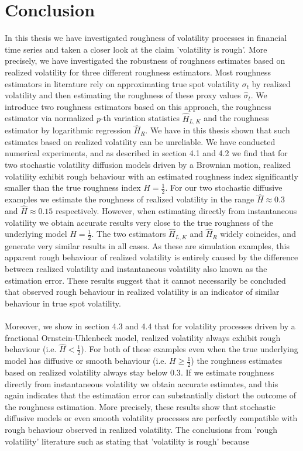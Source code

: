 \documentclass{article}
\begin{document}
\section{Conclusion}
In this thesis we have investigated roughness of volatility processes in financial time series and taken a closer look at the claim 'volatility is rough'. More precisely, we have investigated the robustness of roughness estimates based on realized volatility for three different roughness estimators. Most roughness estimators in literature rely on approximating true spot volatility $\sigma_t$ by realized volatility and then estimating the roughness of these proxy values $\hat{\sigma}_t$. We introduce two roughness estimators based on this approach, the roughness estimator via normalized $p$-th variation statistics $\widehat{H}_{L,K}$ and the roughness estimator by logarithmic regression $\widehat{H}_R$. We have in this thesis shown that such estimates based on realized volatility can be unreliable. We have conducted numerical experiments, and as described in section 4.1 and 4.2 we find that for two stochastic volatility diffusion models driven by a Brownian motion, realized volatility exhibit rough behaviour with an estimated roughness index significantly smaller than the true roughness index $H=\frac{1}{2}$. For our two stochastic diffusive examples we estimate the roughness of realized volatility in the range $\widehat{H}\approx 0.3$ and $\widehat{H}\approx 0.15$ respectively. However, when estimating directly from instantaneous volatility we obtain accurate results very close to the true roughness of the underlying model $H=\frac{1}{2}$. The two estimators $\widehat{H}_{L,K}$ and $\widehat{H}_R$ widely coincides, and generate very similar results in all cases. As these are simulation examples, this apparent rough behaviour of realized volatility is entirely caused by the difference between realized volatility and instantaneous volatility also known as the estimation error. These results suggest that it cannot necessarily be concluded that observed rough behaviour in realized volatility is an indicator of similar behaviour in true spot volatility.\\\\
Moreover, we show in section 4.3 and 4.4 that for volatility processes driven by a fractional Ornstein-Uhlenbeck model, realized volatility always exhibit rough behaviour (i.e. $\widehat{H}<\frac{1}{2}$). For both of these examples even when the true underlying model has diffusive or smooth behaviour (i.e. $H\geq \frac{1}{2}$) the roughness estimates based on realized volatility always stay below $0.3$. If we estimate roughness directly from instantaneous volatility we obtain accurate estimates, and this again indicates that the estimation error can substantially distort the outcome of the roughness estimation. More precisely, these results show that stochastic diffusive models or even smooth volatility processes are perfectly compatible with rough behaviour observed in realized volatility. The conclusions from 'rough volatility' literature such as \cite{gatheral} stating that 'volatility is rough' because \\\\
\end{document}
